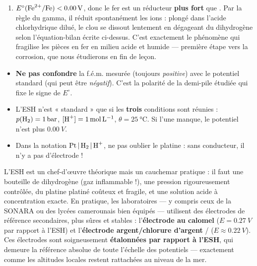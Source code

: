 \documentclass[11pt]{article}
\begin{document}
\begin{exoresolu}
\begin{enumerate}
\[ E^\circ(\ce{Fe^2+}/\ce{Fe}) = \SI{0,00}{V} - \SI{0,44}{V} = \boxed{\SI{-0,44}{V}} \]
Le signe négatif est cohérent avec le fait que le fer est le pôle négatif (il s'oxyde face à ).
\item $E^\circ(\ce{Fe^2+}/\ce{Fe}) < \SI{0,00}{V}$, donc le fer est un réducteur \textbf{plus fort} que . Par la règle du gamma, il réduit spontanément les ions  : plongé dans l'acide chlorhydrique dilué, le clou se dissout lentement en dégageant du dihydrogène selon l'équation-bilan écrite ci-dessus. C'est exactement le phénomène qui fragilise les pièces en fer en milieu acide et humide — première étape vers la corrosion, que nous étudierons en fin de leçon.
\end{enumerate}
\end{exoresolu}

\begin{attention}
\begin{itemize}
\item \textbf{Ne pas confondre} la f.é.m. mesurée (toujours \emph{positive}) avec le potentiel standard (qui peut être \emph{négatif}). C'est la polarité de la demi-pile étudiée qui fixe le signe de $E^\circ$.
\item L'ESH n'est « standard » que si les \textbf{trois} conditions sont réunies : $p(\ce{H2}) = \SI{1}{bar}$, $[\ce{H+}] = \SI{1}{mol.L^{-1}}$, $\theta = \SI{25}{\celsius}$. Si l'une manque, le potentiel n'est plus $\SI{0,00}{V}$.
\item Dans la notation $\ce{Pt | H2 | H+}$, ne pas oublier le platine : sans conducteur, il n'y a pas d'électrode !
\end{itemize}
\end{attention}

\begin{savaistu}
L'ESH est un chef-d'œuvre théorique mais un cauchemar pratique : il faut une bouteille de dihydrogène (gaz inflammable !), une pression rigoureusement contrôlée, du platine platiné coûteux et fragile, et une solution acide à concentration exacte. En pratique, les laboratoires — y compris ceux de la SONARA ou des lycées camerounais bien équipés — utilisent des électrodes de référence secondaires, plus sûres et stables : l'\textbf{électrode au calomel} ($E = \SI{+0,27}{V}$ par rapport à l'ESH) et l'\textbf{électrode argent/chlorure d'argent} / ($E \approx \SI{+0,22}{V}$). Ces électrodes sont soigneusement \textbf{étalonnées par rapport à l'ESH}, qui demeure la référence absolue de toute l'échelle des potentiels — exactement comme les altitudes locales restent rattachées au niveau de la mer.
\end{savaistu}
\end{document}
